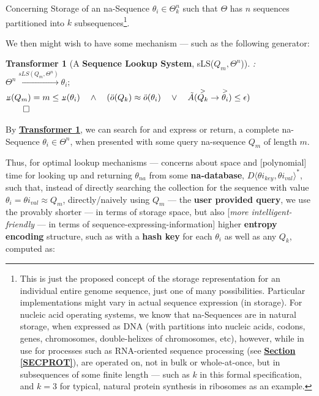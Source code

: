 \documentclass[a4paper, 18pt]{book} %
\newtheorem{transf}{Transformer}
\newcommand{\invpi}{\rotatebox[origin=c]{180}{$\pi$}}
\begin{document}
Concerning Storage of an na-Sequence $\theta_i \in \Theta^n_k$ such that  $\Theta$ has $n$ sequences partitioned into $k$ subsequences\footnote{This is just the proposed concept of the storage representation for an individual entire genome sequence,  just one of many possibilities. Particular implementations might vary in actual sequence expression (in storage). For nucleic acid operating systems, we know that na-Sequences are in natural storage, when expressed as DNA (with partitions into nucleic acids, codons, genes, chromosomes, double-helixes of chromosomes, etc), however, while in use for processes such as RNA-oriented sequence processing (see \textbf{\hyperref[SECPROT]{Section \ref{SECPROT}}}), are operated on, not in bulk or whole-at-once, but in subsequences of some finite length --- such as $k$ in this formal specification, and $k=3$ for typical, natural protein synthesis in ribosomes as an example.}.

We then might wish to have some mechanism --- such as the following generator:\\


\begin{transf}[A \textbf{Sequence Lookup System}, sLS($Q_m,\Theta^n$)]:
\label{TRANSFSEQLOOKUP}
$ $\\
$\Theta^n \xrightarrow{sLS(Q_m,\Theta^n)} \theta_i;$\\ 
$\invpi(Q_m) = m \leq \invpi(\theta_i) \quad \land \quad (\ddot{o}(Q_k) \approx \ddot{o}(\theta_i) \quad \lor \quad \tilde{A}(\overset{>}{Q_k} \rightarrow \overset{>}{\theta_i}) \leq \epsilon)$\\
$\qed$
\end{transf}


By \textbf{\hyperref[TRANSFSEQLOOKUP]{Transformer \ref{TRANSFSEQLOOKUP}}}, we can search for and express or return, a complete na-Sequence $\theta_i \in \Theta^n$, when presented with some query na-sequence $Q_m$ of length $m$.

Thus, for optimal lookup mechanisms --- concerns about space and [polynomial] time for looking up and returning $\theta_{na}$ from some \textbf{na-database}, $D\langle {\theta i}_{key}, {\theta i}_{val} \rangle^*$, such that, instead of directly searching the collection for the sequence with value $\theta_i = {\theta i}_{val} \approx Q_m$, directly/naively using $Q_m$ --- the \textbf{user provided query}, we use the provably shorter --- in terms of storage space, but also [\textit{more intelligent-friendly} --- in terms of sequence-expressing-information] higher \textbf{entropy encoding} structure, such as with a \textbf{hash key} for each $\theta_i$ as well as any $Q_k$, computed as:\\
\end{document}
